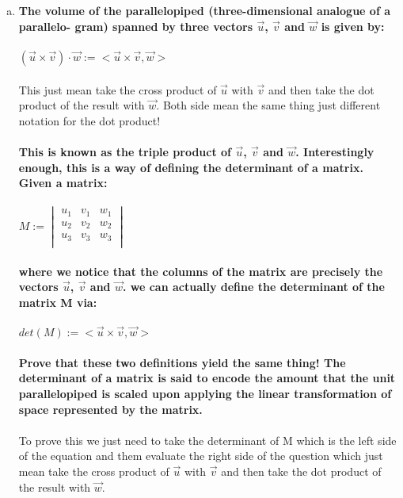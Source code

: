 \documentclass{article}
\begin{document}
\section{}
\begin{enumerate}[a.]
\item\textbf{The volume of the parallelopiped (three-dimensional analogue of a parallelo-
gram) spanned by three vectors $\vec{u}$, $\vec{v}$ and $\vec{w}$ is given by:}\\
\\
$(\vec{u}\times\vec{v})\cdot\vec{w}:=<\vec{u}\times\vec{v},\vec{w}>$\\
\\ This just mean take the cross product of $\vec{u}$ with $\vec{v}$ and then take the dot product of the result with $\vec{w}$. Both side mean the same thing just different notation for the dot product!\\
\\
\textbf{This is known as the triple product of $\vec{u}$, $\vec{v}$ and $\vec{w}$. Interestingly enough, this is a way of defining the determinant of a matrix. Given a matrix:}\\
\\
$M:=\begin{vmatrix}
u_{1}&v_{1}&w_{1}\\
u_{2}&v_{2}&w_{2}\\
u_{3}&v_{3}&w_{3}\\
\end{vmatrix}$\\
\\
\textbf{where we notice that the columns of the matrix are precisely the vectors $\vec{u}$, $\vec{v}$ and $\vec{w}$. we can actually define the determinant of the matrix M via:}\\
\\
$det(M ) := <\vec{u}\times\vec{v},\vec{w}>$\\
\\
\textbf{Prove that these two definitions yield the same thing! The determinant of a
matrix is said to encode the amount that the unit parallelopiped is scaled upon
applying the linear transformation of space represented by the matrix.}\\
\\
To prove this we just need to take the determinant of M which is the left side of the equation and them evaluate the right side of the question which just mean take the cross product of $\vec{u}$ with $\vec{v}$ and then take the dot product of the result with $\vec{w}$.\\

\end{enumerate}
\end{document}

